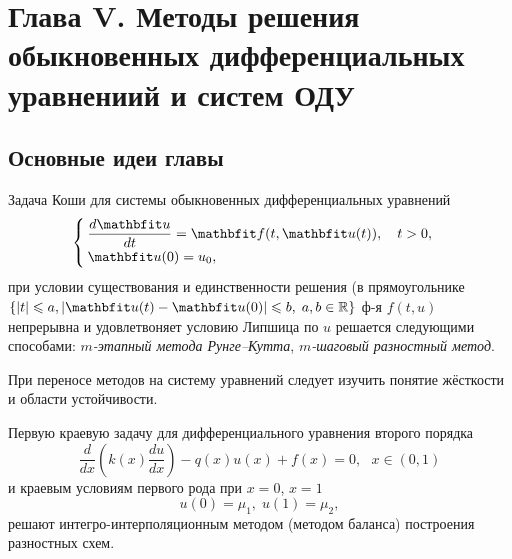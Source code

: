 \newpage
{}
\pagestyle{empty}
\vspace{0.5cm}

\section*{Глава V. Методы решения обыкновенных дифференциальных уравнениий и систем ОДУ}

\subsection{Основные идеи главы} 

Задача Коши для системы обыкновенных дифференциальных уравнений
\begin{equation}
%
    \label{Koshi_sys}
    \begin{cases}
        \dfrac{d\vfunc{u}}{dt} = \vfunc{f}(t, \vfunc{u}(t)), \quad t > 0, \\
        \vfunc{u}(0) = u_0,
    \end{cases}
\end{equation}
при условии существования и единственности решения (в прямоугольнике $\{|t| \leqslant a, | \vfunc{u}(t)-\vfunc{u}(0)| \leqslant b,\; a, b\in\mathbb{R}\}$ ф-я $f(t, u)$ непрерывна и удовлетвоняет условию Липшица по $u$ решается следующими способами: \textit{$m$-этапный метода Рунге--Кутта}, \textit{ $m$-шаговый разностный метод}.

При переносе методов на систему уравнений следует изучить понятие жёсткости и области устойчивости.
 
Первую краевую задачу для дифференциального уравнения второго порядка
\begin{equation}
    \label{eq:2-ord-eq}
    \dfrac{d}{dx}\left(k(x)\dfrac{du}{dx}\right) - q(x)u(x) + f(x) = 0, ~~~x\in(0,1)
\end{equation}
%
и краевым условиям первого рода при $x=0$, $x=1$
%
\begin{equation}
    \label{eq:2-ord-eq-bounds}
    u(0) = \mu_1,\;u(1) = \mu_2,
\end{equation}
%
решают интегро-интерполяционным методом (методом баланса) построения разностных схем.

